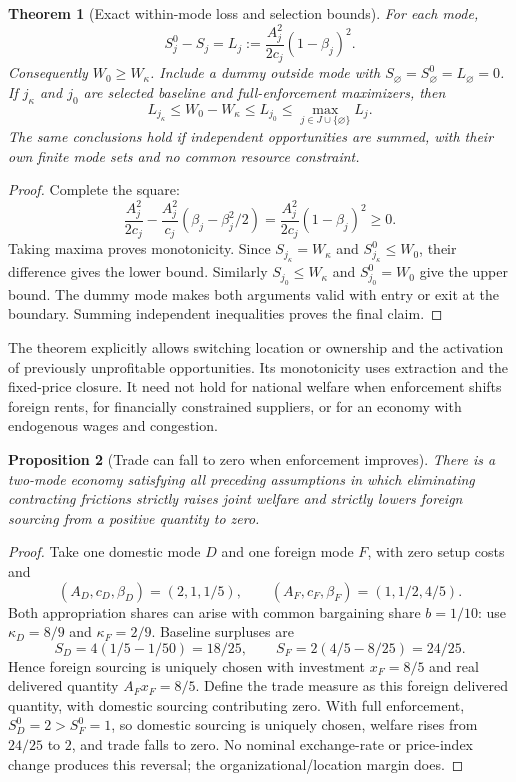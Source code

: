 \documentclass[11pt,a4paper]{article}
\newtheorem{theorem}{Theorem}[section]
\newtheorem{proposition}[theorem]{Proposition}
\theoremstyle{definition}
\theoremstyle{remark}
\begin{document}
\begin{theorem}[Exact within-mode loss and selection bounds]\label{th:welfare}
For each mode,
\[
 S_j^0-S_j=L_j:=\frac{A_j^2}{2c_j}(1-\beta_j)^2.
\]
Consequently $W_0\geq W_\kappa$. Include a dummy outside mode with $S_{\varnothing}=S_{\varnothing}^0=L_{\varnothing}=0$. If $j_\kappa$ and $j_0$ are selected baseline and full-enforcement maximizers, then
\[
 L_{j_\kappa}\leq W_0-W_\kappa\leq L_{j_0}\leq\max_{j\in J\cup\{\varnothing\}}L_j.
\]
The same conclusions hold if independent opportunities are summed, with their own finite mode sets and no common resource constraint.
\end{theorem}
\begin{proof}
Complete the square:
\[
 \frac{A_j^2}{2c_j}-\frac{A_j^2}{c_j}
       (\beta_j-\beta_j^2/2)
 =\frac{A_j^2}{2c_j}(1-\beta_j)^2\geq0.
\]
Taking maxima proves monotonicity. Since $S_{j_\kappa}=W_\kappa$ and $S_{j_\kappa}^0\leq W_0$, their difference gives the lower bound. Similarly $S_{j_0}\leq W_\kappa$ and $S_{j_0}^0=W_0$ give the upper bound. The dummy mode makes both arguments valid with entry or exit at the boundary. Summing independent inequalities proves the final claim.
\end{proof}

The theorem explicitly allows switching location or ownership and the activation of previously unprofitable opportunities. Its monotonicity uses extraction and the fixed-price closure. It need not hold for national welfare when enforcement shifts foreign rents, for financially constrained suppliers, or for an economy with endogenous wages and congestion.

\begin{proposition}[Trade can fall to zero when enforcement improves]\label{pr:trade}
There is a two-mode economy satisfying all preceding assumptions in which eliminating contracting frictions strictly raises joint welfare and strictly lowers foreign sourcing from a positive quantity to zero.
\end{proposition}
\begin{proof}
Take one domestic mode $D$ and one foreign mode $F$, with zero setup costs and
\[
 (A_D,c_D,\beta_D)=(2,1,1/5),\qquad
 (A_F,c_F,\beta_F)=(1,1/2,4/5).
\]
Both appropriation shares can arise with common bargaining share $b=1/10$: use $\kappa_D=8/9$ and $\kappa_F=2/9$. Baseline surpluses are
\[
 S_D=4(1/5-1/50)=18/25,\qquad
 S_F=2(4/5-8/25)=24/25.
\]
Hence foreign sourcing is uniquely chosen with investment $x_F=8/5$ and real delivered quantity $A_Fx_F=8/5$. Define the trade measure as this foreign delivered quantity, with domestic sourcing contributing zero. With full enforcement, $S_D^0=2>S_F^0=1$, so domestic sourcing is uniquely chosen, welfare rises from $24/25$ to $2$, and trade falls to zero. No nominal exchange-rate or price-index change produces this reversal; the organizational/location margin does.
\end{proof}
\end{document}
